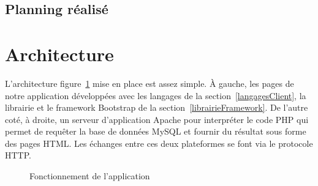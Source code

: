 \documentclass{sigplanconf}
\begin{document}
\subsection{Planning réalisé}
\section{Architecture}
L'architecture figure~\ref{fonctionnementAppli} mise en place est assez simple. À gauche, les pages de notre application développées avec les langages de la section~\ref{langagesClient}, la librairie et le framework Bootstrap de la section~\ref{librairieFramework}. De l'autre coté, à droite, un serveur d'application Apache pour interpréter le code PHP qui permet de requêter la base de données MySQL et fournir du résultat sous forme des pages HTML. Les échanges entre ces deux plateformes se font via le protocole HTTP.
\begin{figure}
\begin{center}
\end{center}
\caption{Fonctionnement de l'application}\label{fonctionnementAppli}
\end{figure}
\end{document}

